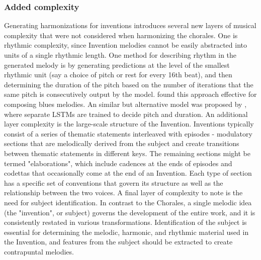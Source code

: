 \documentclass[11pt]{article}
\begin{document}
\subsubsection{Added complexity}
Generating harmonizations for inventions introduces several new layers of musical complexity that were not considered when harmonizing the chorales. One is rhythmic complexity, since Invention melodies cannot be easily abstracted into units of a single rhythmic length. One method for describing rhythm in the generated melody is by generating predictions at the level of the smallest rhythmic unit (say a choice of pitch or rest for every 16th beat), and then determining the duration of the pitch based on the number of iterations that the same pitch is consecutively output by the model. \citet{eck2002blues} found this approach effective for composing blues melodies. An similar but alternative model was proposed by \citet{franklin2006jazz}, where separate LSTMs are trained to decide pitch and duration. An additional layer complexity is the large-scale structure of the Invention. Inventions typically consist of a series of thematic statements interleaved with episodes - modulatory sections that are melodically derived from the subject and create transitions between thematic statements in different keys. The remaining sections might be termed "elaborations", which include cadences at the ends of episodes and codettas that occasionally come at the end of an Invention. Each type of section has a specific set of conventions that govern its structure as well as the relationship between the two voices. A final layer of complexity to note is the need for subject identification. In contrast to the Chorales, a single melodic idea (the "invention", or subject) governs the development of the entire work, and it is consistently restated in various transformations. Identification of the subject is essential for determining the melodic, harmonic, and rhythmic material used in the Invention, and features from the subject should be extracted to create contrapuntal melodies.
\end{document}
